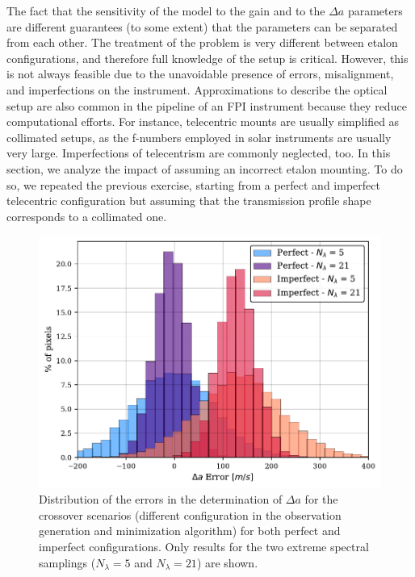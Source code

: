 The fact that the sensitivity of the model to the gain and to the $\Delta a$ parameters are different guarantees (to some extent) that the parameters can be separated from each other. The treatment of the problem is very different between etalon configurations, and therefore full knowledge of the setup is critical. However, this is not always feasible due to the unavoidable presence of errors, misalignment, and imperfections on the instrument. Approximations to describe the optical setup are also common in the pipeline of an FPI instrument because they reduce computational efforts. For instance, telecentric mounts are usually simplified as collimated setups, as the f-numbers employed in solar instruments are usually very large. Imperfections of telecentrism are commonly neglected, too. In this section, we analyze the impact of assuming an incorrect etalon mounting. To do so, we repeated the previous exercise, starting from a perfect and imperfect telecentric configuration but assuming that the transmission profile shape corresponds to a collimated one.    

\begin{figure}[t]
    \begin{minipage}[c]{0.6\textwidth}
      \includegraphics[width=\textwidth]{figures/EtalonPaper/histograms.pdf}
    \end{minipage}\hfill
    \begin{minipage}[c]{0.37\textwidth}
      \caption[Error distribution for imperfect telecentrism.]{
        Distribution of the errors in the determination of $\Delta a$ for the crossover scenarios (different configuration in the observation generation and minimization algorithm) for both perfect and imperfect configurations. Only results for the two extreme spectral samplings ($N_ \lambda = 5$ and $N_\lambda = 21$) are shown.
      } \label{fig_etalon_corr:Crossover_histograms}
    \end{minipage}
  \end{figure}


